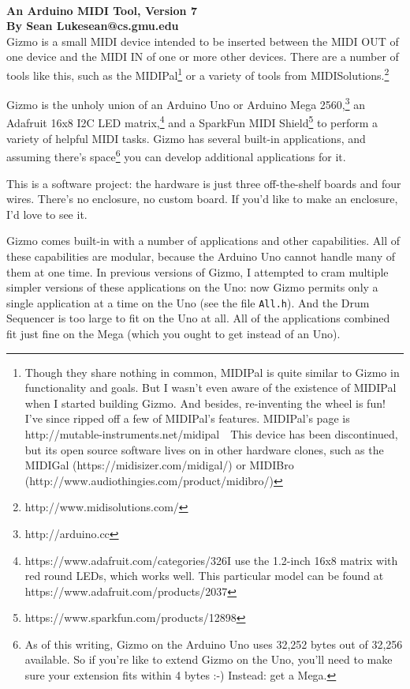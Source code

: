 \documentclass{article}
\begin{document}
\\[0.5em]
{\large \bf An Arduino MIDI Tool, Version 7\\
By Sean Luke\quad sean@cs.gmu.edu} 
\\


\noindent Gizmo is a small MIDI device intended to be inserted between the MIDI OUT of one device and the MIDI IN of one or more other devices.  There are a number of tools like this, such as the MIDIPal\footnote{Though they share nothing in common, MIDIPal is quite similar to Gizmo in functionality and goals.  But I wasn't even aware of the existence of MIDIPal when I started building Gizmo.  And besides, re-inventing the wheel is fun!  I've since ripped off a few of MIDIPal's features.  MIDIPal's page is http:/\!/mutable-instruments.net/midipal\ \ This device has been discontinued, but its open source software lives on in other hardware clones, such as the MIDIGal (https:/\!/midisizer.com/midigal/) or MIDIBro (http:/\!/www.audiothingies.com/product/midibro/)} or a variety of tools from MIDISolutions.\footnote{http:/\!/www.midisolutions.com/}

Gizmo is the unholy union of an Arduino Uno or Arduino Mega 2560,\footnote{http:/\!/arduino.cc} an Adafruit 16x8 I2C LED matrix,\footnote{https:/\!/www.adafruit.com/categories/326\quad I use the 1.2-inch 16x8 matrix with red round LEDs, which works well.  This particular model can be found at https:/\!/www.adafruit.com/products/2037} and a SparkFun MIDI Shield\footnote{https:/\!/www.sparkfun.com/products/12898} to perform a variety of helpful MIDI tasks.  Gizmo has several built-in applications, and assuming there's space\footnote{As of this writing, Gizmo on the Arduino Uno uses 32,252 bytes out of 32,256 available.  So if you're like to extend Gizmo on the Uno, you'll need to make sure your extension fits within 4 bytes :-)  Instead: get a Mega.} you can develop additional applications for it.

This is a software project: the hardware is just three off-the-shelf boards and four wires.  There's no enclosure, no custom board.  If you'd like to make an enclosure, I'd love to see it.

Gizmo comes built-in with a number of applications and other capabilities.  All of these capabilities are modular, because the Arduino Uno cannot handle many of them at one time.  In previous versions of Gizmo, I attempted to cram multiple simpler versions of these applications on the Uno: now Gizmo permits only a single application at a time on the Uno (see the file \texttt{All.h}).  And the Drum Sequencer is too large to fit on the Uno at all.  All of the applications combined fit just fine on the Mega (which you ought to get instead of an Uno).
\end{document}
